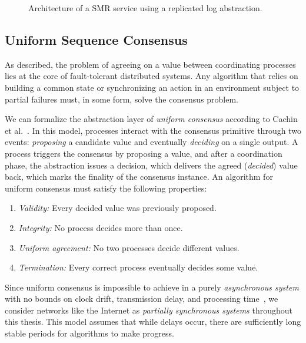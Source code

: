 \begin{figure}[t]
    \centering
    
    \caption{Architecture of a \gls{SMR} service using a replicated log abstraction.}
    \label{fig:state_machine_replication}
\end{figure}


\subsection{Uniform Sequence Consensus}
\label{sect:uniform_sequence_consensus}
As described, the problem of agreeing on a value between coordinating processes lies at the core of fault-tolerant distributed systems. Any algorithm that relies on building a common state or synchronizing an action in an environment subject to partial failures must, in some form, solve the consensus problem.

We can formalize the abstraction layer of \textit{uniform consensus} according to Cachin et al.~\cite{Cachin-ReliableDistributedProgramming-2011}. In this model, processes interact with the consensus primitive through two events: \textit{proposing} a candidate value and eventually \textit{deciding} on a single output. A process triggers the consensus by proposing a value, and after a coordination phase, the abstraction issues a decision, which delivers the agreed (\textit{decided}) value back, which marks the finality of the consensus instance. An algorithm for uniform consensus must satisfy the following properties:
\begin{enumerate}
  \item[] \textit{Validity:} Every decided value was previously proposed.
  \item[] \textit{Integrity:} No process decides more than once.
  \item[] \textit{Uniform agreement:} No two processes decide different values.
  \item[] \textit{Termination:} Every correct process eventually decides some value.
\end{enumerate}

Since uniform consensus is impossible to achieve in a purely \textit{asynchronous system} with no bounds on clock drift, transmission delay, and processing time~\cite{Fischer-ConsensusAsynchronousSystem-1985}, we consider networks like the Internet as \textit{partially synchronous systems} throughout this thesis. This model assumes that while delays occur, there are sufficiently long stable periods for algorithms to make progress.

